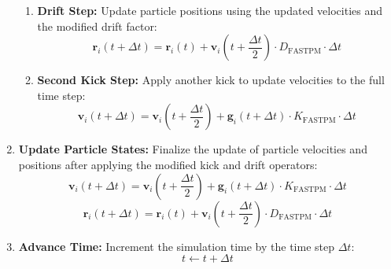 \begin{enumerate}
\begin{enumerate}
        \item \textbf{Drift Step:}
        Update particle positions using the updated velocities and the modified drift factor:
        \[
        \mathbf{r}_i(t + \Delta t) = \mathbf{r}_i(t) + \mathbf{v}_i\left(t + \frac{\Delta t}{2}\right) \cdot D_{\text{FASTPM}} \cdot \Delta t
        \]
        
        \item \textbf{Second Kick Step:}
        Apply another kick to update velocities to the full time step:
        \[
        \mathbf{v}_i(t + \Delta t) = \mathbf{v}_i\left(t + \frac{\Delta t}{2}\right) + \mathbf{g}_i(t + \Delta t) \cdot K_{\text{FASTPM}} \cdot \Delta t
        \]
    \end{enumerate}
    
    \item \textbf{Update Particle States:}
    Finalize the update of particle velocities and positions after applying the modified kick and drift operators:
    \[
    \mathbf{v}_i(t + \Delta t) = \mathbf{v}_i\left(t + \frac{\Delta t}{2}\right) + \mathbf{g}_i(t + \Delta t) \cdot K_{\text{FASTPM}} \cdot \Delta t
    \]
    \[
    \mathbf{r}_i(t + \Delta t) = \mathbf{r}_i(t) + \mathbf{v}_i\left(t + \frac{\Delta t}{2}\right) \cdot D_{\text{FASTPM}} \cdot \Delta t
    \]
    
    \item \textbf{Advance Time:}
    Increment the simulation time by the time step $\Delta t$:
    \[
    t \leftarrow t + \Delta t
    \]
\end{enumerate}
